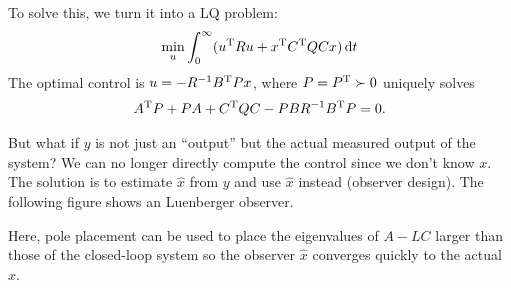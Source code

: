To solve this, we turn it into a LQ problem:
\begin{gather}
  \min_u \int_0^\infty (u^\text{T} Ru + x^\text{T} C^\text{T} Q Cx)\mathop{}\!\mathrm{d} t
\end{gather}
The optimal control is $u=-R^{-1}B^\text{T} Px$, where $P=P^\text{T}\succ0$ uniquely solves
\begin{gather}
  A^\text{T} P + PA + C^\text{T} QC - PBR^{-1}B^\text{T} P = 0.
\end{gather}

But what if $y$ is not just an ``output'' but the actual measured output of the system? We can no longer directly compute the control since we don't know $x$. The solution is to estimate $\hat x$ from $y$ and use $\hat x$ instead (observer design). The following figure shows an Luenberger observer.

\begin{center}
\end{center}
Here, pole placement can be used to place the eigenvalues of $A-LC$ larger than those of the closed-loop system so the observer $\hat x$ converges quickly to the actual $x$.

